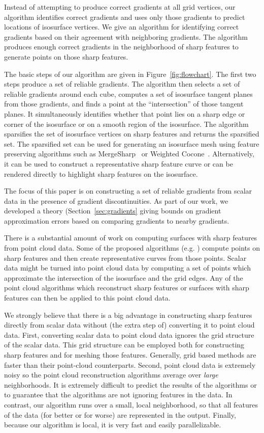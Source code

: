 Instead of attempting to produce correct gradients at all grid vertices,
our algorithm identifies correct gradients 
and uses only those gradients to predict locations
of isosurface vertices.
We give an algorithm for identifying correct gradients
based on their agreement with neighboring gradients.
The algorithm produces enough correct gradients in the neighborhood
of sharp features to generate points on those sharp features.

The basic steps of our algorithm are given in Figure~\ref{fig:flowchart}.
The first two steps produce a set of reliable gradients.
The algorithm then selects a set of reliable gradients around each cube,
computes a set of isosurface tangent planes from those gradients,
and finds a point at the ``intersection'' of those tangent planes.
It simultaneously identifies whether that point lies 
on a sharp edge or corner of the isosurface
or on a smooth region of the isosurface.
The algorithm sparsifies the set of isosurface vertices on sharp features
and returns the sparsified set.
The sparsified set can be used for generating an isosurface mesh
using feature preserving algorithms such as MergeSharp~\cite{bw-cisec-13}
or Weighted Cocone~\cite{dgqsww-fprss-12}.
Alternatively, it can be used to construct a representative sharp
feature curve or can be rendered directly to highlight sharp features
on the isosurface.

The focus of this paper is on constructing a set of reliable gradients
from scalar data in the presence of gradient discontinuities.
As part of our work, we developed a theory (Section~\ref{sec:gradients} 
giving bounds on gradient approximation errors
based on comparing gradients to nearby gradients.

There is a substantial amount of work on computing surfaces 
with sharp features from point cloud data.
Some of the proposed algorithms (e.g. \cite{dgqsww-fprss-12,sym-fpmg-10})
compute points on sharp features
and then create representative curves from those points.
Scalar data might be turned into point cloud data 
by computing a set of points which approximate the
intersection of the isosurface and the grid edges.
Any of the point cloud algorithms which reconstruct sharp features 
or surfaces with sharp features can then be applied to this point cloud data.

We strongly believe that there is a big advantage in constructing sharp features
directly from scalar data without (the extra step of) converting it to point cloud data.
First, converting scalar data to point cloud data ignores the grid structure
of the scalar data.
This grid structure can be employed both for constructing sharp features
and for meshing those features. Generally, grid based methods are faster than their point-cloud counterparts.
Second, point cloud data is extremely noisy so the point cloud 
reconstruction algorithms average over \textit{large} neighborhoods.
It is extremely difficult to predict the results of the algorithms
or to guarantee that the algorithms are not ignoring features in the data.
In contrast, our algorithm runs over a small, local neighborhood,
so that all features of the data (for better or for worse) are represented in the output.
Finally, because our algorithm is local,
it is very fast and easily parallelizable.

